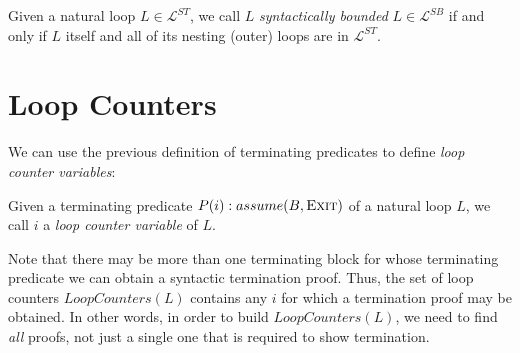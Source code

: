 \begin{definition}
    Given a natural loop $L \in \mathcal{L}^{ST}$, we call $L$ \emph{syntactically bounded} $L \in \mathcal{L}^{SB}$ if and only if $L$ itself and all of its nesting (outer) loops are in $\mathcal{L}^{ST}$.
\end{definition}

\section{Loop Counters}
\label{sec:loop_counters}

We can use the previous definition of terminating predicates to define \emph{loop counter variables}:

\begin{definition}
    Given a terminating predicate $P(i): assume(B, \textsc{Exit})$ of a natural loop $L$, we call $i$ a \emph{loop counter variable} of $L$.
\end{definition}

Note that there may be more than one terminating block for whose terminating predicate we can obtain a syntactic termination proof. Thus, the set of loop counters $LoopCounters(L)$ contains any $i$ for which a termination proof may be obtained. In other words, in order to build $LoopCounters(L)$, we need to find \emph{all} proofs, not just a single one that is required to show termination.


